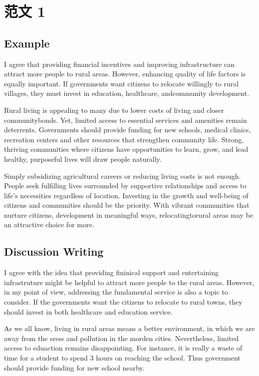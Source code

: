 \section{范文 1}

\subsection{Example}

I agree that providing financial incentives and improving infrastructure can attract more people to rural areas. However, enhancing quality of life factors is equally important. If governments want citizens to relocate willingly to rural villages, they must invest in education, healthcare, andcommunity development.

Rural living is appealing to many due to lower costs of living and closer communitybonds. Yet, limited access to essential services and amenities remain deterrents. Governments should provide funding for new schools, medical clinics, recreation centers and other resources that strengthen community life. Strong, thriving communities where citizens have opportunities to learn, grow, and lead healthy, purposeful lives will draw people naturally.

Simply subsidizing agricultural careers or reducing living costs is not enough. People seek fulfilling lives surrounded by supportive relationships and access to life's necessities regardless of location. Investing in the growth and well-being of citizens and communities should be the priority. With vibrant communities that nurture citizens, development in meaningful ways, relocatingtorural areas may be an attractive choice for more.

\subsection{Discussion Writing}

I agree with the idea that providing fininical support and entertaining infrastruture might be helpful to attract more people to the rural areas. However, in my point of view, addressing the fundamental service is also a topic to consider. If the governments want the citizens to relocate to rural towns, they should invest in both healthcare and education service.

As we all know, living in rural areas means a better environment, in which we are away from the sress and pollution in the morden cities. Nevertheless, limited access to eduaction remains disappointing. For instance, it is really a waste of time for a student to spend 3 hours on reaching the school. Thus government should provide funding for new school nearby.

